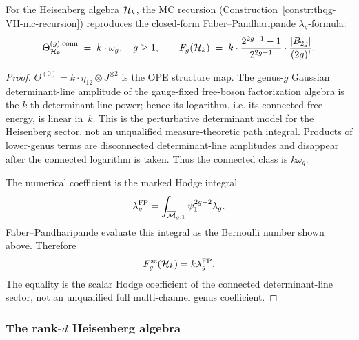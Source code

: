 \begin{theorem}
\label{thm:thqg-VII-recursion-closed}
For the Heisenberg algebra $\mathcal{H}_k$, the MC recursion
\textup{(}Construction~\textup{\ref{constr:thqg-VII-mc-recursion})}
reproduces the closed-form Faber--Pandharipande $\lambda_g$-formula:
\begin{equation}%
\Theta^{(g),\mathrm{conn}}_{\cH_k}
\;=\;
k\cdot\omega_g,\quad g\ge1,
\qquad
F_g(\cH_k)
\;=\;
k\cdot
\frac{2^{2g-1}-1}{2^{2g-1}} \cdot
\frac{|B_{2g}|}{(2g)!}.
\end{equation}
\end{theorem}

\begin{proof}
$\Theta^{(0)} = k \cdot \eta_{12} \otimes J^{\otimes 2}$
is the OPE structure map. The genus-$g$ Gaussian determinant-line
amplitude of the gauge-fixed free-boson factorization algebra is the
$k$-th determinant-line power; hence its logarithm, i.e. its connected
free energy, is linear in~$k$. This is the perturbative determinant
model for the Heisenberg sector, not an unqualified measure-theoretic
path integral. Products of lower-genus terms are disconnected
determinant-line amplitudes and disappear after the connected
logarithm is taken. Thus the connected class is $k\omega_g$.

The numerical coefficient is the marked Hodge integral
\[
\lambda_g^{\mathrm{FP}}
=\int_{\overline{\mathcal{M}}_{g,1}}\psi_1^{2g-2}\lambda_g.
\]
Faber--Pandharipande evaluate this integral as the Bernoulli number
shown above. Therefore
\[
F_g^{\mathrm{sc}}(\mathcal{H}_k)=k\lambda_g^{\mathrm{FP}}.
\]
The equality is the scalar Hodge coefficient of the connected
determinant-line sector, not an unqualified full multi-channel genus
coefficient.
\end{proof}

\subsubsection{The rank-$d$ Heisenberg algebra}

